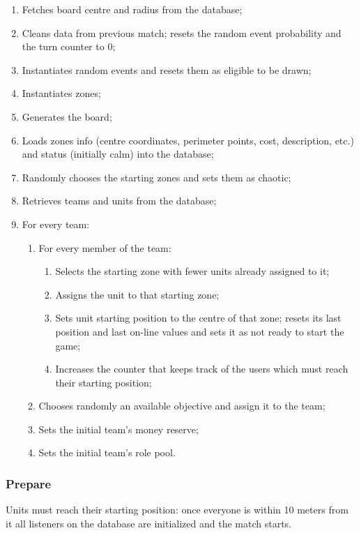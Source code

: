 			\begin{enumerate}
				\item Fetches board centre and radius from the database;
				\item Cleans data from previous match; resets the random event probability and the turn counter to 0;
				\item Instantiates random events and resets them as eligible to be drawn;
				\item Instantiates zones;
				\item Generates the board;
				\item Loads zones info (centre coordinates, perimeter points, cost, description, etc.) and status (initially calm) into the database;
				\item Randomly chooses the starting zones and sets them as chaotic;
				\item Retrieves teams and units from the database;
				\item For every team: 
				\begin{enumerate}					
					\item For every member of the team:
					\begin{enumerate}
						\item Selects the starting zone with fewer units already assigned to it;
						\item Assigns the unit to that starting zone;
						\item Sets unit starting position to the centre of that zone; resets its last position and last on-line values and sets it as not ready to start the game;
						\item Increases the counter that keeps track of the users which must reach their starting position;
					\end{enumerate}
					\item Chooses randomly an available objective and assign it to the team;
					\item Sets the initial team's money reserve;
					\item Sets the initial team's role pool.
				\end{enumerate}
			\end{enumerate}
		
		\subsubsection{Prepare}
		
			Units must reach their starting position: once everyone is within 10 meters from it all listeners on the database are initialized and the match starts.
		
